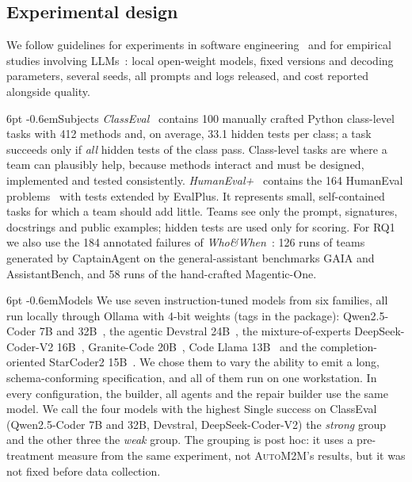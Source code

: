 \documentclass[pdflatex,sn-mathphys-num]{sn-jnl}
\makeatletter
\theoremstyle{thmstyleone}%
\theoremstyle{thmstyletwo}%
\theoremstyle{thmstylethree}%
\newcommand{\auto}{\textsc{AutoM2M}}
\renewcommand\paragraph{\@startsection{paragraph}{4}{\z@}%
  {6pt \@plus 2pt \@minus 1pt}{-0.6em}{\normalfont\normalsize\bfseries}}
\makeatother
\begin{document}
\subsection{Experimental design}\label{sec:design}

We follow guidelines for experiments in software
engineering~\cite{wohlin2012experimentation} and for empirical studies involving
LLMs~\cite{wagner2025guidelines,sallou2024breaking}: local open-weight models,
fixed versions and decoding parameters, several seeds, all prompts and logs
released, and cost reported alongside quality.

\paragraph{Subjects} \emph{ClassEval}~\cite{du2024classeval} contains 100
manually crafted Python class-level tasks with 412 methods and, on average, 33.1
hidden tests per class; a task succeeds only if \emph{all} hidden tests of the
class pass. Class-level tasks are where a team can plausibly help, because
methods interact and must be designed, implemented and tested consistently.
\emph{HumanEval+}~\cite{liu2023evalplus} contains the 164 HumanEval
problems~\cite{chen2021codex} with tests extended by EvalPlus. It represents
small, self-contained tasks for which a team should add little. Teams see only
the prompt, signatures, docstrings and public examples; hidden tests are used
only for scoring. For RQ1 we also use the 184 annotated failures of
\emph{Who\&When}~\cite{zhang2025whowhen}: 126 runs of teams generated by
CaptainAgent on the general-assistant benchmarks GAIA and AssistantBench, and 58
runs of the hand-crafted Magentic-One.

\paragraph{Models} We use seven instruction-tuned models from six families, all
run locally through Ollama with 4-bit weights (tags in the package):
Qwen2.5-Coder 7B and 32B~\cite{hui2024qwen25coder}, the agentic
Devstral 24B~\cite{rastogi2025devstral}, the mixture-of-experts
DeepSeek-Coder-V2 16B~\cite{deepseek2024coderv2}, Granite-Code
20B~\cite{mishra2024granitecode}, Code Llama 13B~\cite{roziere2023codellama} and
the completion-oriented StarCoder2 15B~\cite{lozhkov2024starcoder2}. We chose
them to vary the ability to emit a long, schema-conforming specification, and
all of them run on one workstation. In every configuration, the builder, all
agents and the repair builder use the same model. We call the four models with
the highest Single success on ClassEval (Qwen2.5-Coder 7B and 32B, Devstral,
DeepSeek-Coder-V2) the \emph{strong} group and the other three the \emph{weak}
group. The grouping is post hoc: it uses a pre-treatment measure from the same
experiment, not \auto{}'s results, but it was not fixed before data
collection.
\end{document}
